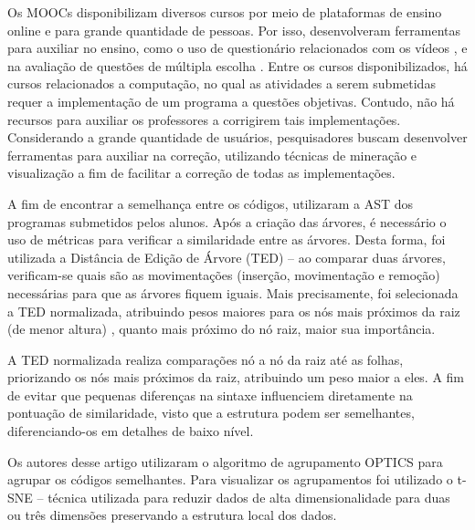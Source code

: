 		Os \acs{MOOC}s disponibilizam diversos cursos por meio de plataformas de ensino
		online e para grande quantidade de pessoas. Por isso, desenvolveram ferramentas
		para auxiliar no ensino, como o uso de questionário relacionados com os vídeos
		\cite{fassbinder2014}, e na avaliação de questões de múltipla escolha \cite{alario2013analysing}.
		Entre os cursos disponibilizados, há cursos relacionados a computação, no qual
		as atividades a serem submetidas requer a implementação de um programa a
		questões objetivas. Contudo, não há recursos para auxiliar os professores
		a corrigirem tais implementações. Considerando a grande quantidade de usuários,
		pesquisadores buscam desenvolver ferramentas para auxiliar na correção,
		utilizando técnicas de mineração e visualização a fim de facilitar a correção
		de todas as implementações.
	
		A fim de encontrar a semelhança entre os códigos, 
		utilizaram a AST dos programas submetidos pelos alunos. Após a criação das
		árvores, é necessário o uso de métricas para verificar a similaridade entre
		as árvores. Desta forma, foi utilizada a Distância de Edição de Árvore (\ac{TED})
		– ao comparar duas árvores, verificam-se quais são as movimentações (inserção,
		movimentação e remoção) necessárias para que as árvores fiquem iguais. Mais
		precisamente, foi selecionada a \acs{TED} normalizada, atribuindo pesos maiores para
		os nós mais próximos da raiz (de menor altura) \cite{zhang1989simple}, quanto
		mais próximo do nó raiz, maior sua importância.

		A \acs{TED} normalizada realiza comparações nó a nó da raiz até as folhas, priorizando
		os nós mais próximos da raiz, atribuindo um peso maior a eles. A fim de evitar
		que pequenas diferenças na sintaxe influenciem diretamente na pontuação de
		similaridade, visto que a estrutura podem ser semelhantes, diferenciando-os
		em detalhes de baixo nível.
		
		Os autores desse artigo utilizaram o algoritmo de agrupamento \ac{OPTICS}
		\cite{Ankerst1999} para agrupar os códigos semelhantes. Para visualizar os
		agrupamentos foi utilizado o \ac{t-SNE} \cite{maaten2008} – técnica utilizada para
		reduzir dados de alta dimensionalidade para duas ou três dimensões preservando
		a estrutura local dos dados.


